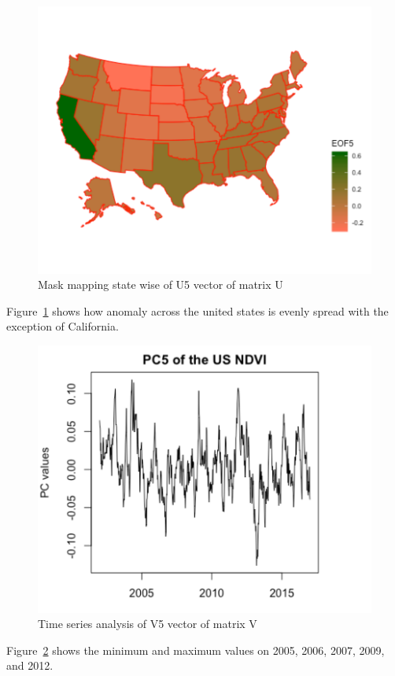      \begin{figure}[H]
            \centering
            \includegraphics[width=0.70\linewidth]{figures/ch5/SVD/eof5.png}
            \caption{\label{fig:EOF_5} Mask mapping state wise of U5 vector of matrix U}
    \end{figure}
    
    Figure~\ref{fig:EOF_5} shows how anomaly across the united states is evenly spread with the exception of California.
    
     \begin{figure}[H]
            \centering
            \includegraphics[width=0.70\linewidth]{figures/ch5/SVD/pc5.png}
            \caption{\label{fig:V_5} Time series analysis of V5 vector of matrix V}
    \end{figure}
    
    Figure~\ref{fig:V_5} shows the minimum and maximum values on 2005, 2006, 2007, 2009, and 2012.